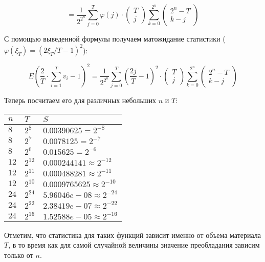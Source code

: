 \documentclass[utf8x, 14pt]{G7-32} %
\begin{document}
$$= \dfrac{1}{2^{2^n}} \sum_{j=0}^T \varphi(j)\cdot\left( \begin{aligned} T \\ j \end{aligned} \right) \sum_{k = 0}^{2^n}   \left( \begin{aligned} 2^n-T \\ k-j \end{aligned} \right) $$

С помощью выведенной формулы получаем матожидание статистики \big($\varphi(\xi_T) = (2\xi_T/T  - 1)^2$\big):

$$E \left(\dfrac{2}{T} \cdot \sum_{i = 1}^T v_i - 1\right)^2 = \dfrac{1}{2^{2^n}} \sum_{j=0}^T \left(\dfrac{2 j}{T} - 1\right)^2\cdot\left( \begin{aligned} T \\ j \end{aligned} \right) \sum_{k = 0}^{2^n}   \left( \begin{aligned} 2^n-T \\ k-j \end{aligned} \right)$$

Теперь посчитаем его для различных небольших $n$ и $T$:

\begin{center}
\begin{tabular}{ |p{}| p{}| p{}| }
\hline
 $n$ & $T$ & $S$ \\
 \hline
 \hline
 $8$ & $2^8$ & $0.00390625 = 2^{-8}$ \\
 \hline
 $8$ & $2^7$ & $0.0078125 = 2^{-7}$ \\
 \hline
 $8$ & $2^6$ & $0.015625 = 2^{-6}$ \\
 \hline
 $12$ & $2^{12}$ & $0.000244141 \approx 2^{-12}$ \\
 \hline
 $12$ & $2^{11}$ & $0.000488281 \approx 2^{-11}$ \\
 \hline
 $12$ & $2^{10}$ & $0.0009765625 \approx 2^{-10}$ \\
 \hline
 $24$ & $2^{24}$ & $5.96046e-08 \approx 2^{-24}$ \\
 \hline
 $24$ & $2^{22}$ & $2.38419e-07 \approx 2^{-22}$ \\
 \hline
 $24$ & $2^{16}$ & $1.52588e-05 \approx 2^{-16}$ \\
\hline
\end{tabular}
\end{center}

Отметим, что статистика для таких функций зависит именно от объема материала $T$, в то время как для самой случайной величины значение преобладания зависим только от $n$.
\end{document}
